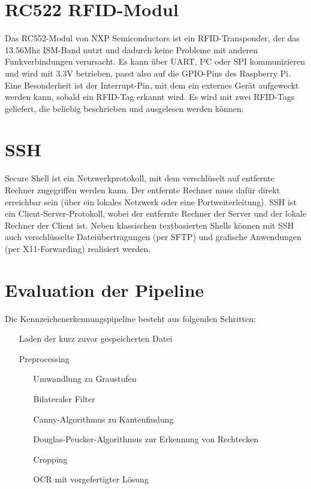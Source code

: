 \section{RC522 RFID-Modul}

Das RC552-Modul von NXP Semiconductors ist ein RFID-Transponder, der das 13.56Mhz ISM-Band nutzt und dadurch keine Probleme mit anderen Funkverbindungen verursacht. Es kann über UART, I²C oder SPI kommunizieren und wird mit 3.3V betrieben, passt also auf die GPIO-Pins des Raspberry Pi. Eine Besonderheit ist der Interrupt-Pin, mit dem ein externes Gerät aufgeweckt werden kann, sobald ein RFID-Tag erkannt wird. Es wird mit zwei RFID-Tags geliefert, die beliebig beschrieben und ausgelesen werden können. 

\section{SSH}

Secure Shell ist ein Netzwerkprotokoll, mit dem verschlüselt auf entfernte Rechner zugegriffen werden kann. Der entfernte Rechner muss dafür direkt erreichbar sein (über ein lokales Netzwerk oder eine Portweiterleitung).
SSH ist ein Client-Server-Protokoll, wobei der entfernte Rechner der Server und der lokale Rechner der Client ist. Neben klassischen textbasierten Shells können mit SSH auch verschlüsselte Dateiübertragungen (per SFTP) und grafische Anwendungen (per X11-Forwarding) realisiert werden.


\section{Evaluation der Pipeline}

Die Kennzeichenerkennungspipeline besteht aus folgenden Schritten:
\begin{itemize}
    \item[Laden der kurz zuvor gespeicherten Datei]
    \item[Preprocessing]
    \begin{itemize}
        \item[Umwandlung zu Graustufen]
        \item[Bilateraler Filter]
        \item[Canny-Algorithmus zu Kantenfindung]
        \item[Douglas-Peucker-Algorithmus zur Erkennung von Rechtecken]
        \item[Cropping]
        \item[OCR mit vorgefertigter Lösung]
    \end{itemize}
\end{itemize}

